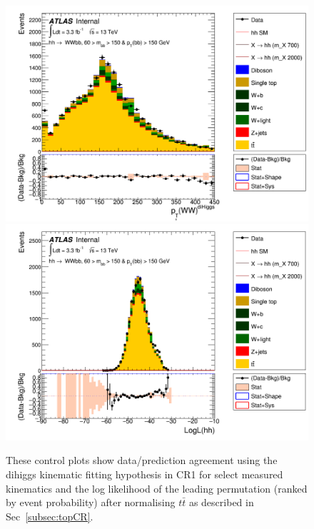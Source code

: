 \begin{figure}[!hb]
\begin{center}
		\includegraphics[width=.47\textwidth]{figures/kinFit_appendix/bbpt150_NF1168/C_mBBcr_opt700_bbpt150_KLF_dihiggs_ww_pt}
                \includegraphics[width=.47\textwidth]{figures/kinFit_appendix/bbpt150_NF1168/C_mBBcr_opt700_bbpt150_LogLikelihood_dihiggs}
	\caption{These control plots show data/prediction agreement using the dihiggs kinematic fitting hypothesis in CR1 for select measured kinematics and the log likelihood of the leading permutation (ranked by event probability) after normalising $t\bar{t}$ as described in Sec~\ref{subsec:topCR}.}
	\label{fig:klfitter_control_plots_hh_bbpt150_nf1168}
	\end{center}    
	\end{figure}

